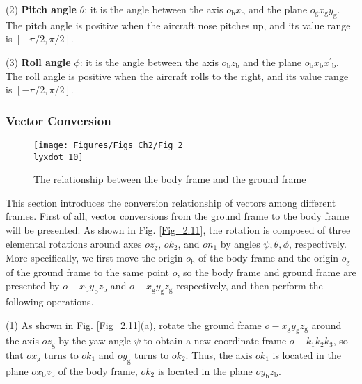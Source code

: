 (2) \textbf{Pitch angle} $\theta$: it is the angle between the axis ${{o}_{\text{b}}}{{x}_{\text{b}}}$
and the plane ${{o}_{\text{g}}}{{x}_{\text{g}}}{{y}_{\text{g}}}$. The
pitch angle is positive when the aircraft nose pitches up, and its
value range is $\left[-{\pi}/2,{{\pi}/{2}}\right]$. 

(3) \textbf{Roll angle} $\phi$: it is the angle between the axis ${{o}_{\text{b}}}{{z}_{\text{b}}}$
and the plane ${{o}_{\text{b}}}{{x}_{\text{b}}}{{{x}^{\prime}}_{\text{b}}}$.
The roll angle is positive when the aircraft rolls to the right, and
its value range is $\left[-{\pi}/2,{{\pi}/{2}}\right]$. 

\subsubsection{Vector Conversion}

\begin{figure}
	\begin{centering}
		\texttt{[image: Figures/Figs\_Ch2/Fig\_2\\lyxdot 10]}
		\par\end{centering}
	\caption{The relationship between the body frame and the ground frame}
	
	\centering{}\label{Fig_2.10}
\end{figure}

This section introduces the conversion relationship of vectors among
different frames. First of all, vector conversions from the ground
frame to the body frame will be presented. As shown in Fig. \ref{Fig_2.11},
the rotation is composed of three elemental rotations around axes
$o{{z}_\text{g}}$, $o{{k}_{2}}$, and $o{{n}_{1}}$ by angles $\psi,\theta,\phi$,
respectively. More specifically, we first move the origin ${{o}_{\text{b}}}$
of the body frame and the origin ${{o}_{\text{g}}}$ of the ground
frame to the same point $o$, so the body frame and ground frame are
presented by $o-{{x}_{\text{b}}}{{y}_{\text{b}}}{{z}_{\text{b}}}$
and $o-{{x}_{\text{g}}}{{y}_{\text{g}}}{{z}_{\text{g}}}$ respectively,
and then perform the following operations.

(1) As shown in Fig. \ref{Fig_2.11}(a), rotate the ground frame $o-{{x}_{\text{g}}}{{y}_{\text{g}}}{{z}_{\text{g}}}$
around the axis $o{{z}_{\text{g}}}$ by the yaw angle $\psi$ to obtain
a new coordinate frame $o-{{k}_{1}}{{k}_{2}}{{k}_{3}}$, so that $o{{x}_{\text{g}}}$
turns to $o{{k}_{1}}$ and $o{{y}_{\text{g}}}$ turns to $o{{k}_{2}}$.
Thus, the axis $o{{k}_{1}}$ is located in the plane $o{{x}_{\text{b}}}{{z}_{\text{b}}}$
of the body frame, $o{{k}_{2}}$ is located in the plane $o{{y}_{\text{b}}}{{z}_{\text{b}}}$. 

